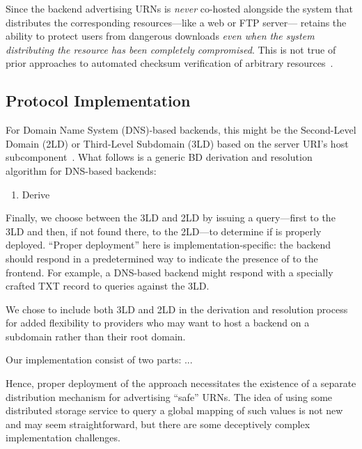 Since the backend advertising URNs is \emph{never} co-hosted alongside the
system that distributes the corresponding resources---like a web or FTP
server---\SYSTEM{} retains the ability to protect users from dangerous downloads
\emph{even when the system distributing the resource has been completely
compromised}. This is not true of prior approaches to automated checksum
verification of arbitrary resources~\cite{Cherubini}.

\subsection{Protocol Implementation}



For Domain Name System (DNS)-based backends, this might be the Second-Level
Domain (2LD) or Third-Level Subdomain (3LD) based on the server URI's host
subcomponent~\cite{RFC3986}. What follows is a generic BD derivation and
resolution algorithm for DNS-based backends:

\begin{enumerate}
    \item Derive 
\end{enumerate}

Finally, we choose between the 3LD and 2LD by issuing a query---first to the 3LD
and then, if not found there, to the 2LD---to determine if \SYSTEM{} is properly
deployed. ``Proper deployment'' here is implementation-specific: the backend
should respond in a predetermined way to indicate the presence of \SYSTEM{} to
the frontend. For example, a DNS-based backend might respond with a specially
crafted TXT record to queries against the 3LD.

We chose to include both 3LD and 2LD in the derivation and resolution process
for added flexibility to providers who may want to host a backend on a subdomain
rather than their root domain.

Our \SYSTEM{} implementation consist of two parts: ...

Hence, proper deployment of the \SYSTEM{} approach necessitates the existence of
a separate distribution mechanism for advertising ``safe'' URNs. The idea of
using some distributed storage service to query a global mapping of such values
is not new and may seem straightforward, but there are some deceptively complex
implementation challenges.

